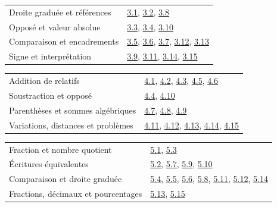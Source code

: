 \begin{tabularx}{\linewidth}{@{}Yl@{}}\toprule
Droite graduée et références & \hyperref[exo-3-1]{3.1}, \hyperref[exo-3-2]{3.2}, \hyperref[exo-3-8]{3.8}\\[2mm]
Opposé et valeur absolue & \hyperref[exo-3-3]{3.3}, \hyperref[exo-3-4]{3.4}, \hyperref[exo-3-10]{3.10}\\[2mm]
Comparaison et encadrements & \hyperref[exo-3-5]{3.5}, \hyperref[exo-3-6]{3.6}, \hyperref[exo-3-7]{3.7}, \hyperref[exo-3-12]{3.12}, \hyperref[exo-3-13]{3.13}\\[2mm]
Signe et interprétation & \hyperref[exo-3-9]{3.9}, \hyperref[exo-3-11]{3.11}, \hyperref[exo-3-14]{3.14}, \hyperref[exo-3-15]{3.15}\\[2mm]
\bottomrule\end{tabularx}\par\vspace{4mm}
\clearpage
{}\fontsize{10}{13}\selectfont
{}\begin{tabularx}{\linewidth}{@{}Yl@{}}\toprule
Addition de relatifs & \hyperref[exo-4-1]{4.1}, \hyperref[exo-4-2]{4.2}, \hyperref[exo-4-3]{4.3}, \hyperref[exo-4-5]{4.5}, \hyperref[exo-4-6]{4.6}\\[2mm]
Soustraction et opposé & \hyperref[exo-4-4]{4.4}, \hyperref[exo-4-10]{4.10}\\[2mm]
Parenthèses et sommes algébriques & \hyperref[exo-4-7]{4.7}, \hyperref[exo-4-8]{4.8}, \hyperref[exo-4-9]{4.9}\\[2mm]
Variations, distances et problèmes & \hyperref[exo-4-11]{4.11}, \hyperref[exo-4-12]{4.12}, \hyperref[exo-4-13]{4.13}, \hyperref[exo-4-14]{4.14}, \hyperref[exo-4-15]{4.15}\\[2mm]
\bottomrule\end{tabularx}\par\vspace{4mm}
\begin{tabularx}{\linewidth}{@{}Yl@{}}\toprule
Fraction et nombre quotient & \hyperref[exo-5-1]{5.1}, \hyperref[exo-5-3]{5.3}\\[2mm]
Écritures équivalentes & \hyperref[exo-5-2]{5.2}, \hyperref[exo-5-7]{5.7}, \hyperref[exo-5-9]{5.9}, \hyperref[exo-5-10]{5.10}\\[2mm]
Comparaison et droite graduée & \hyperref[exo-5-4]{5.4}, \hyperref[exo-5-5]{5.5}, \hyperref[exo-5-6]{5.6}, \hyperref[exo-5-8]{5.8}, \hyperref[exo-5-11]{5.11}, \hyperref[exo-5-12]{5.12}, \hyperref[exo-5-14]{5.14}\\[2mm]
Fractions, décimaux et pourcentages & \hyperref[exo-5-13]{5.13}, \hyperref[exo-5-15]{5.15}\\[2mm]
\bottomrule\end{tabularx}\par\vspace{4mm}
